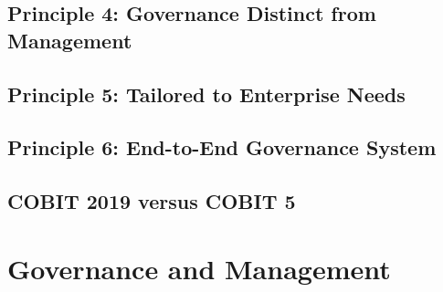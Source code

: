 


\subsection{Principle 4: Governance Distinct from Management}





\subsection{Principle 5: Tailored to Enterprise Needs}





\subsection{Principle 6: End-to-End Governance System}





\subsection{COBIT 2019 versus COBIT 5}



\section{Governance and Management}

